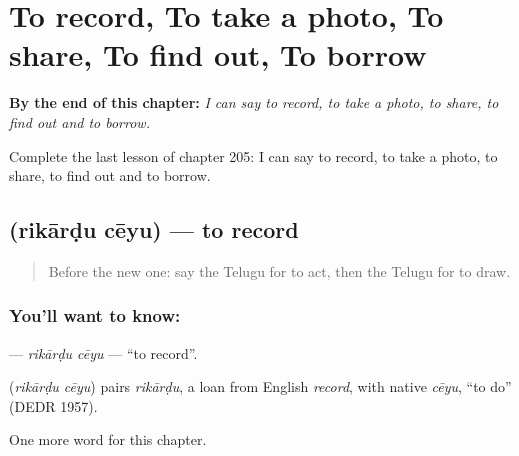 
\chapter{To record, To take a photo, To share, To find out, To borrow}
\label{ch:te-to-record-to-take-a-photo-to-share-to-find-out-to-borrow}

\begin{chapteropening}
\textbf{By the end of this chapter:} \emph{I can say to record, to take a photo, to share, to find out and to borrow.}

Complete the last lesson of chapter 205: I can say to record, to take a photo, to share, to find out and to borrow.
\end{chapteropening}

\section[\texorpdfstring{\te{రికార్డు} \te{చేయు} (rikārḍu cēyu)}{రికార్డు చేయు (rikārḍu cēyu)}]{  (rikārḍu cēyu) — to record}

\label{lesson:TE-C205-rikardu-ceyu}



\begin{quote}
Before the new one: say the Telugu for to act, then the Telugu for to draw.
\end{quote}

\subsection*{You'll want to know:  }
\textbf{ } — \emph{rikārḍu cēyu} — \textquotedblleft{}to record\textquotedblright{}.

\begin{cousinweb}
\textbf{ } (\emph{rikārḍu cēyu}) pairs \emph{rikārḍu}, a loan from English \emph{record}, with native \emph{cēyu}, \textquotedblleft{}to do\textquotedblright{} (DEDR 1957).
\end{cousinweb}

\begin{grammarlens}[title={What you've built}]
One more word for this chapter.
\end{grammarlens}

